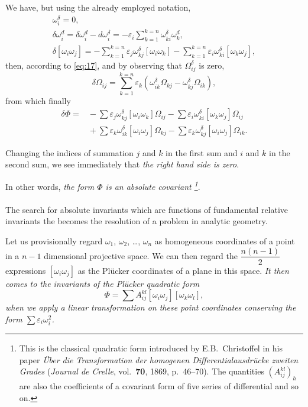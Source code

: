 \documentclass[leqno,12pt]{article}
\makeatletter
\let\old@epsilon\epsilon
\let\old@varepsilon\varepsilon
\let\epsilon\old@varepsilon
\let\varepsilon\old@epsilon
\theoremstyle{shape1}
\theoremstyle{shape0}
\theoremstyle{shape2}
\theoremstyle{definition}
\makeatother
\begin{document}
We have, but using the already employed notation,
\begin{gather*}
  \omega_{i}^{\delta}=0,\\
  \delta\omega^{d}_{i}=\delta\omega_{i}^{d}-d\omega_{i}^{\delta}=-\epsilon_{i}\sum_{k=1}^{k=n}\omega_{ki}^{\delta}\omega_{k}^{d},\\
  \delta[\omega_{i}\omega_{j}]=-\sum_{k=1}^{k=n}\epsilon_{j}\omega_{kj}^{\delta}[\omega_{i}\omega_{k}]-\sum_{k=1}^{k=n}\epsilon_{i}\omega_{ki}^{\delta}[\omega_{k}\omega_{j}],
\end{gather*}
then, according to \eqref{eq:17}, and by observing that $\Omega^{\delta}_{ij}$ is zero,
\[
\delta\Omega_{ij}=\sum_{k=1}^{k=n}\epsilon_{k}(\omega_{ik}^{\delta}\Omega_{kj}-\omega_{kj}^{\delta}\Omega_{ik}),
\]
from which finally
\begin{align*}
  \delta\Phi=&{}-\sum\epsilon_{j}\omega^{\delta}_{kj}[\omega_{i}\omega_{k}]\Omega_{ij}-\sum\epsilon_{i}\omega_{ki}^{\delta}[\omega_{k}\omega_{j}]\Omega_{ij}\\
  &{}+\sum\epsilon_{k}\omega_{ik}^{\delta}[\omega_{i}\omega_{j}]\Omega_{kj}-\sum\epsilon_{k}\omega_{kj}^{\delta}[\omega_{i}\omega_{j}]\Omega_{ik}.
\end{align*}

Changing the indices of summation $j$ and $k$ in the first sum and $i$ and $k$ in the second sum, we see immediately that \emph{the right hand side is zero}.

In other words, \emph{the form $\Phi$ is an absolute covariant \footnote{This is the classical quadratic form introduced by E.B.~Christoffel in his paper \emph{Über die Transformation der homogenen Differentialausdrücke zweiten Grades} (\emph{Journal de Crelle}, vol.\ \textbf{70}, 1869, p.\ 46--70). The quantities $(A_{ij}^{kl})_{h}$ are also the coefficients of a covariant form of five series of differential and so on.}}.

\paragraph{}
\label{sec:25}
The search for absolute invariants which are functions of fundamental relative invariants the becomes the resolution of a problem in analytic geometry.

Let us provisionally regard $\omega_{1}$, $\omega_{2}$, \dots, $\omega_{n}$ as homogeneous coordinates of a point in a $n-1$ dimensional projective space. We can then regard the $\dfrac{n(n-1)}{2}$ expressions $[\omega_{i}\omega_{j}]$ as the Plücker coordinates of a plane in this space. \emph{It then comes to the invariants of the Plücker quadratic form}
\begin{equation}
  \label{eq:43a}
  \Phi=\sum A^{kl}_{ij}[\omega_{i}\omega_{j}][\omega_{k}\omega_{l}],
\end{equation}
\emph{when we apply a linear transformation on these point coordinates conserving the form $\sum \epsilon_{i}\omega_{i}^{2}$.}
\end{document}
